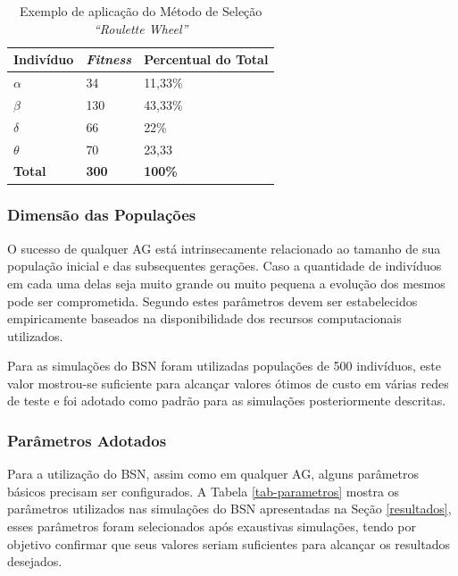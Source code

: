 \begin{table}[ht]
\centering
\begin{tabular}{|l|l|l|}
\hline
\multicolumn{1}{|c|}{\textbf{Indivíduo}} & \multicolumn{1}{c|}{\textbf{\emph{Fitness}}} & \textbf{Percentual do Total} \\ \hline
\textbf{$\alpha$} & 34 & 11,33\% \\ \hline
\textbf{$\beta$} & 130 & 43,33\% \\ \hline
\textbf{$\delta$} & 66 & 22\% \\ \hline
\textbf{$\theta$} & 70 & 23,33 \\ \hline
\textbf{Total} & \textbf{300} & \textbf{100\%} \\ \hline
\end{tabular}
\caption[\emph{``Roulette Wheel''}]{Exemplo de aplicação do Método de Seleção \emph{``Roulette Wheel''}}
\label{tab-selecao}
\end{table}

\subsubsection{Dimensão das Populações}
O sucesso de qualquer AG está intrinsecamente relacionado ao tamanho de sua população inicial e das subsequentes gerações. Caso a quantidade de indivíduos em cada uma delas seja muito grande ou muito pequena a evolução dos mesmos pode ser comprometida. Segundo \cite{Goldberg1889} estes parâmetros devem ser estabelecidos empiricamente baseados na disponibilidade dos recursos computacionais utilizados.

Para as simulações do BSN foram utilizadas populações de 500 indivíduos, este valor mostrou-se suficiente para alcançar valores ótimos de custo em várias redes de teste e foi adotado como padrão para as simulações posteriormente descritas.

\subsubsection{Parâmetros Adotados}
\label{parametros}
Para a utilização do BSN, assim como em qualquer AG, alguns parâmetros básicos precisam ser configurados. A Tabela \ref{tab-parametros} mostra os parâmetros utilizados nas simulações do BSN apresentadas na Seção \ref{resultados}, esses parâmetros foram selecionados após exaustivas simulações, tendo por objetivo confirmar que seus valores seriam suficientes para alcançar os resultados desejados.

